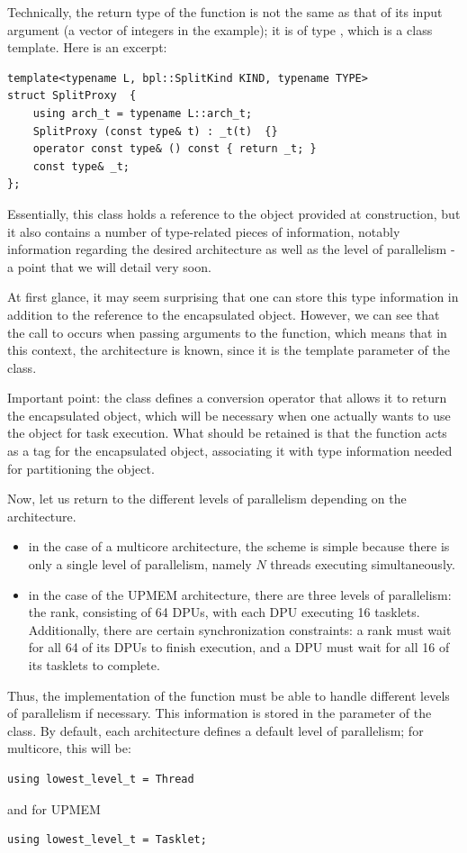 Technically, the return type of the  function is not the same as that of its input argument 
(a vector of integers in the example); it is of type , which is a class template. Here is an excerpt:
\begin{verbatim}
template<typename L, bpl::SplitKind KIND, typename TYPE>
struct SplitProxy  {
    using arch_t = typename L::arch_t;
    SplitProxy (const type& t) : _t(t)  {}
    operator const type& () const { return _t; }
    const type& _t;
};
\end{verbatim}
Essentially, this class holds a reference to the object provided at construction, but it also contains a number of 
type-related pieces of information, notably information regarding the desired architecture as well as the level of 
parallelism - a point that we will detail very soon.

At first glance, it may seem surprising that one can store this type information in addition to the reference to 
the encapsulated object. However, we can see that the call to  occurs when passing arguments to the 
 function, which means that in this context, the architecture is known, 
since it is the template parameter of the  class.

Important point: the  class defines a conversion operator that allows it to return the encapsulated object, 
which will be necessary when one actually wants to use the object for task execution. 
What should be retained is that the  function acts as a tag for the encapsulated object, 
associating it with type information needed for partitioning the object.

Now, let us return to the different levels of parallelism depending on the architecture.
\begin{itemize}
	\item in the case of a multicore architecture, the scheme is simple because there is only a single level of parallelism, 
	namely $N$ threads executing simultaneously.
	\item in the case of the UPMEM architecture, there are three levels of parallelism: the rank, consisting of 64 DPUs, 
	with each DPU executing 16 tasklets. Additionally, there are certain synchronization constraints: 
	a rank must wait for all 64 of its DPUs to finish execution, and a DPU must wait for all 16 of its tasklets to complete.
\end{itemize}

Thus, the implementation of the  function must be able to handle different levels of parallelism if necessary. 
This information is stored in the  parameter of the  class. By default, each architecture 
defines a default level of parallelism; for multicore, this will be:
\begin{verbatim}
using lowest_level_t = Thread
\end{verbatim}
and for UPMEM
\begin{verbatim}
using lowest_level_t = Tasklet;
\end{verbatim}

